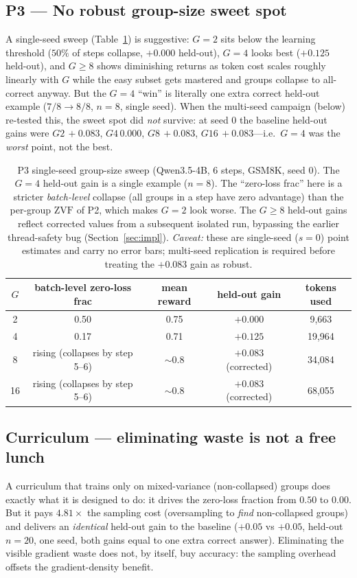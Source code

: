 \documentclass[11pt,a4paper]{article}
\newcommand{\zvf}{\mathrm{ZVF}}
\begin{document}
\subsection{P3 --- No robust group-size sweet spot}

A single-seed sweep (Table~\ref{tab:p3}) is suggestive: $G{=}2$ sits below the
learning threshold ($50\%$ of steps collapse, $+0.000$ held-out), $G{=}4$ looks
best ($+0.125$ held-out), and $G\ge8$ shows diminishing returns as token cost
scales roughly linearly with $G$ while the easy subset gets mastered and groups
collapse to all-correct anyway. But the $G{=}4$ ``win'' is literally one extra
correct held-out example ($7/8 \to 8/8$, $n=8$, single seed). When the multi-seed
campaign (below) re-tested this, the sweet spot did \emph{not} survive: at seed 0
the baseline held-out gains were $G2\,{+}0.083$, $G4\,{0.000}$, $G8\,{+}0.083$,
$G16\,{+}0.083$---i.e.\ $G{=}4$ was the \emph{worst} point, not the best.

\begin{table}[t]
\centering
\small
\begin{tabular}{@{}ccccc@{}}
\toprule
$G$ & batch-level zero-loss frac & mean reward & held-out gain & tokens used \\
\midrule
2  & 0.50 & 0.75 & $+0.000$ & 9{,}663 \\
4  & 0.17 & 0.71 & $+0.125$ & 19{,}964 \\
8  & rising (collapses by step 5--6) & ${\sim}0.8$ & $+0.083$ (corrected) & 34{,}084 \\
16 & rising (collapses by step 5--6) & ${\sim}0.8$ & $+0.083$ (corrected) & 68{,}055 \\
\bottomrule
\end{tabular}
\caption{P3 single-seed group-size sweep (Qwen3.5-4B, 6 steps, GSM8K, seed 0).
The $G{=}4$ held-out gain is a single example ($n=8$). The ``zero-loss frac''
here is a stricter \emph{batch-level} collapse (all groups in a step have zero
advantage) than the per-group $\zvf$ of P2, which makes $G{=}2$ look worse. The
$G\ge8$ held-out gains reflect corrected values from a subsequent isolated run, bypassing
the earlier thread-safety bug (Section~\ref{sec:impl}). \emph{Caveat:} these are single-seed ($s{=}0$) point estimates and carry no error
bars; multi-seed replication is required before treating the $+0.083$ gain as robust.}
\label{tab:p3}
\end{table}

\subsection{Curriculum --- eliminating waste is not a free lunch}
A curriculum that trains only on mixed-variance (non-collapsed) groups does
exactly what it is designed to do: it drives the zero-loss fraction from $0.50$
to $0.00$. But it pays $4.81\times$ the sampling cost (oversampling to \emph{find}
non-collapsed groups) and delivers an \emph{identical} held-out gain to the
baseline ($+0.05$ vs $+0.05$, held-out $n=20$, one seed, both gains equal to one
extra correct answer). Eliminating the visible gradient waste does not, by
itself, buy accuracy: the sampling overhead offsets the gradient-density benefit.
\end{document}
